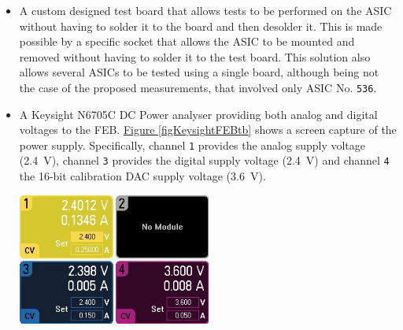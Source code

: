 \begin{itemize}
    \itemsep0em 
    \item A custom designed test board that allows tests to be performed on the ASIC without having to solder it to the board and then desolder it. This is made possible by a specific socket that allows the ASIC to be mounted and removed without having to solder it to the test board. This solution also allows several ASICs to be tested using a single board, although being not the case of the proposed measurements, that involved only ASIC No. \texttt{536}.
    \item A Keysight N6705C DC Power analyser providing both analog and digital voltages to the FEB. \hyperref[figKeysightFEBtb]{Figure \ref{figKeysightFEBtb}} shows a screen capture of the power supply. Specifically, channel \texttt{1} provides the analog supply voltage (\SI{2.4}{\volt}), channel \texttt{3} provides the digital supply voltage (\SI{2.4}{\volt}) and channel \texttt{4} the 16-bit calibration DAC supply voltage (\SI{3.6}{\volt}).
    
    \begin{minipage}{\linewidth}
    \vspace{0.4cm}
        \centering
        \includegraphics[width=0.5\textwidth]{Images/chap1/power_supply_screen_TB.jpg}
        \label{figKeysightFEBtb}
        \vspace{0.4cm}
    \end{minipage}
    

\end{itemize}
